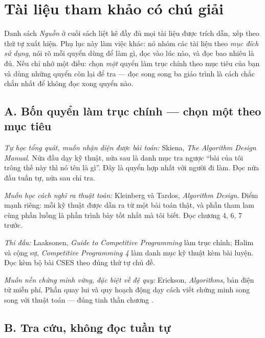 \documentclass[algorithm.tex]{subfiles}
\begin{document}
\chapter*{Tài liệu tham khảo có chú giải}

\begin{tomtat}
Danh sách \emph{Nguồn} ở cuối sách liệt kê đầy đủ mọi tài liệu được trích dẫn, xếp theo thứ tự xuất hiện. Phụ lục này làm việc khác: nó nhóm các tài liệu theo \emph{mục đích sử dụng}, nói rõ mỗi quyển dùng để làm gì, đọc vào lúc nào, và đọc bao nhiêu là đủ. Nếu chỉ nhớ một điều: chọn \emph{một} quyển làm trục chính theo mục tiêu của bạn và dùng những quyển còn lại để tra --- đọc song song ba giáo trình là cách chắc chắn nhất để không đọc xong quyển nào.
\end{tomtat}

\section*{A. Bốn quyển làm trục chính --- chọn một theo mục tiêu}

\emph{Tự học tổng quát, muốn nhận diện được bài toán:} Skiena, \emph{The Algorithm Design Manual}\cite{skiena2020}. Nửa đầu dạy kỹ thuật, nửa sau là danh mục tra ngược ``bài của tôi trông thế này thì nó tên là gì''. Đây là quyển hợp nhất với người đi làm. Đọc nửa đầu tuần tự, nửa sau chỉ tra.

\emph{Muốn học cách \emph{nghĩ ra} thuật toán:} Kleinberg và Tardos, \emph{Algorithm Design}\cite{kleinberg2006}. Điểm mạnh riêng: mỗi kỹ thuật được dẫn ra từ một bài toán thật, và phần tham lam cùng phần luồng là phần trình bày tốt nhất mà tôi biết. Đọc chương 4, 6, 7 trước.

\emph{Thi đấu:} Laaksonen, \emph{Guide to Competitive Programming}\cite{laaksonen2017} làm trục chính; Halim và cộng sự, \emph{Competitive Programming 4}\cite{halim2020} làm danh mục kỹ thuật kèm bài luyện. Đọc kèm bộ bài CSES\cite{cses} theo đúng thứ tự chủ đề.

\emph{Muốn nền chứng minh vững, đặc biệt về đệ quy:} Erickson, \emph{Algorithms}\cite{erickson2019}, bản điện tử miễn phí. Phần quay lui và quy hoạch động dạy cách viết chứng minh song song với thuật toán --- đúng tinh thần chương .

\section*{B. Tra cứu, không đọc tuần tự}
\end{document}
